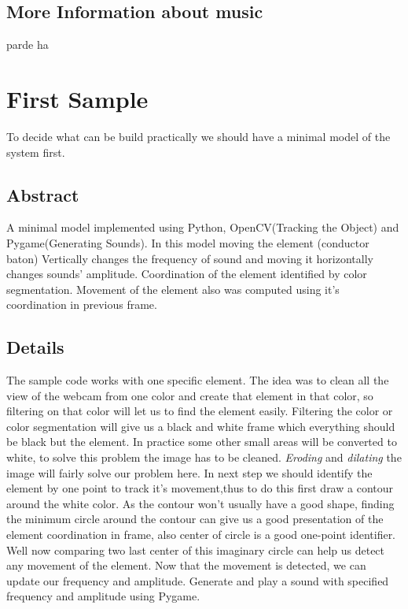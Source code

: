 \documentclass{report}
\begin{document}
\subsection{More Information about music}
parde ha




\pagebreak
\section{First Sample}
To decide what can be build practically we should have a minimal model of the system first.

\subsection{Abstract}
A minimal model implemented using Python, OpenCV(Tracking the Object) and Pygame(Generating Sounds). In this model moving the element (conductor baton) Vertically changes the frequency of sound and moving it horizontally changes sounds' amplitude. Coordination of the element identified by color segmentation. \newline Movement of the element also was computed using it's coordination in previous frame.
\subsection{Details}
The sample code works with one specific element. The idea was to clean all the view of the webcam from one color and create that element in that color, so filtering on that color will let us to find the element easily. Filtering the color or color segmentation will give us a black and white frame which everything should be black but the element. In practice some other small areas will be converted to white, to solve this problem the image has to be cleaned. \textit{Eroding} and \textit{dilating} the image will fairly solve our problem here. In next step we should identify the element by one point to track it's movement,thus to do this first draw a contour around the white color. As the contour won't usually have a good shape, finding the minimum circle around the contour can give us a good presentation of the element coordination in frame, also center of circle is a good one-point identifier. \newline
Well now comparing two last center of this imaginary circle can help us detect any movement of the element. Now that the movement is detected, we can update our frequency and amplitude. Generate and play a sound with specified frequency and amplitude using Pygame. 
\end{document}
